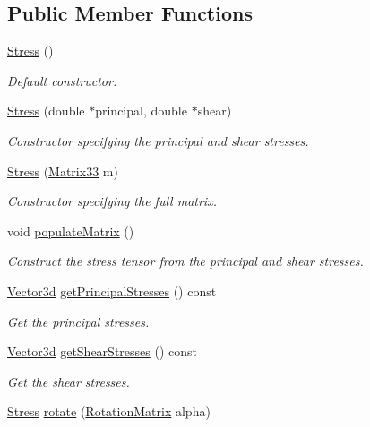\subsection*{\-Public \-Member \-Functions}
\begin{DoxyCompactItemize}
\item 
\hyperlink{classStress_aa01e83a3f6791cbadc5a368e3a40515e}{\-Stress} ()
\begin{DoxyCompactList}\small\item\em \-Default constructor. \end{DoxyCompactList}\item 
\hyperlink{classStress_ae4e2f6250e3bdd4d3d78a9c6bdde7bab}{\-Stress} (double $\ast$principal, double $\ast$shear)
\begin{DoxyCompactList}\small\item\em \-Constructor specifying the principal and shear stresses. \end{DoxyCompactList}\item 
\hyperlink{classStress_a267d09256246063f83de6e747d1bfe00}{\-Stress} (\hyperlink{classMatrix33}{\-Matrix33} m)
\begin{DoxyCompactList}\small\item\em \-Constructor specifying the full matrix. \end{DoxyCompactList}\item 
void \hyperlink{classStress_aa395d5763df8feb4689e0c5524c9e562}{populate\-Matrix} ()
\begin{DoxyCompactList}\small\item\em \-Construct the stress tensor from the principal and shear stresses. \end{DoxyCompactList}\item 
\hyperlink{classVector3d}{\-Vector3d} \hyperlink{classStress_a8e611f68135ec71c1c4bdad7a16c4ac7}{get\-Principal\-Stresses} () const 
\begin{DoxyCompactList}\small\item\em \-Get the principal stresses. \end{DoxyCompactList}\item 
\hyperlink{classVector3d}{\-Vector3d} \hyperlink{classStress_a9c25c029485d2e3acb7989ce9a05462a}{get\-Shear\-Stresses} () const 
\begin{DoxyCompactList}\small\item\em \-Get the shear stresses. \end{DoxyCompactList}\item 
\hyperlink{classStress}{\-Stress} \hyperlink{classStress_a8bbcd34d10748bf6febd32213ac5bf8e}{rotate} (\hyperlink{classRotationMatrix}{\-Rotation\-Matrix} alpha)

\end{DoxyCompactItemize}
